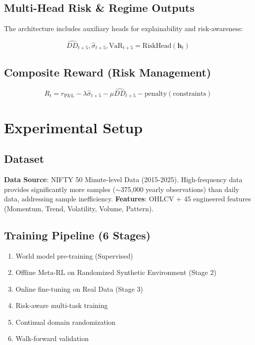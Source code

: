 \documentclass[11pt]{article}
\begin{document}
\subsection{Multi-Head Risk \& Regime Outputs}

The architecture includes auxiliary heads for explainability and risk-awareness:

\begin{equation}
    \hat{DD}_{t+5}, \hat{\sigma}_{t+5}, \text{VaR}_{t+5} = \text{RiskHead}(\mathbf{h}_t)
\end{equation}

\subsection{Composite Reward (Risk Management)}

\begin{equation}
    R_t = r_{\text{P\&L}} - \lambda \hat{\sigma}_{t+5} - \mu \hat{DD}_{t+5} - \text{penalty}(\text{constraints})
\end{equation}

\section{Experimental Setup}

\subsection{Dataset}
\textbf{Data Source}: NIFTY 50 Minute-level Data (2015-2025). High-frequency data provides significantly more samples ($\sim$375,000 yearly observations) than daily data, addressing sample inefficiency.
\textbf{Features}: OHLCV + 45 engineered features (Momentum, Trend, Volatility, Volume, Pattern).

\subsection{Training Pipeline (6 Stages)}
\begin{enumerate}
    \item World model pre-training (Supervised)
    \item Offline Meta-RL on Randomized Synthetic Environment (Stage 2)
    \item Online fine-tuning on Real Data (Stage 3)
    \item Risk-aware multi-task training
    \item Continual domain randomization
    \item Walk-forward validation
\end{enumerate}
\end{document}
